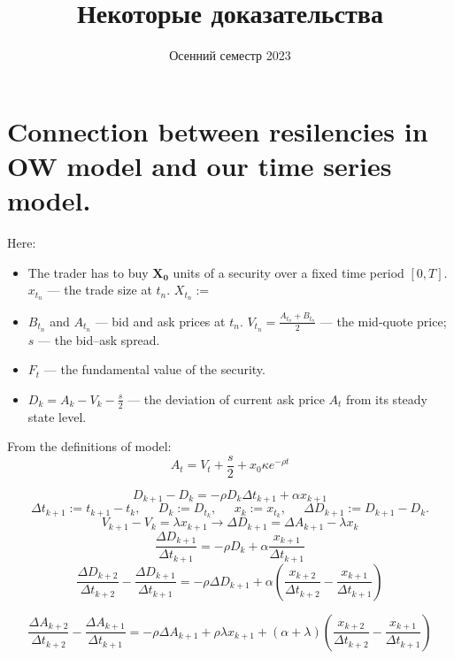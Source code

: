 \documentclass[a4paper]{article}
\date{Осенний семестр 2023}
\title{Некоторые доказательства}
\theoremstyle{definition}
\begin{document}
    \section{Connection between resilencies in OW model and our time series model.}

    Here:
       \begin{itemize}
        \item The trader has to buy $\mathbf{X_0}$ units of a security over a ﬁxed time period $[0,T]$. $x_{t_n}$ 
        --- the trade size at $t_n$. $X_{t_n} := $ 
        \item $B_{t_n}$ and $A_{t_n}$ --- bid and ask prices at $t_n$. $V_{t_n} = \frac{A_{t_n} + B_{t_n}}{2}$ 
        --- the mid-quote price; $s$ --- the bid–ask spread.
        \item $F_t$ --- the fundamental value of the security.
        \item $ D_k = A_k - V_k - \frac{s}{2} $ --- the deviation of current ask price $A_t$ from its steady state level.

       \end{itemize}
       From the definitions of model:
       \[A_t = V_t + \frac{s}{2} + x_0 \kappa e^{- \rho t}\]
       
    \[ D_{k+1} - D_k = -\rho D_k \Delta t_{k+1} + \alpha x_{k+1} \]
    \[ \Delta t_{k+1} := t_{k+1} - t_k, \; \; \; \; \; D_k := D_{t_k}, \; \; \; \; \; x_{k}:= x_{t_k}, \; \; \; \; \; \Delta D_{k+1} := D_{k+1} - D_k . \]
    \[ V_{k+1} - V_k = \lambda x_{k+1} \rightarrow \Delta D_{k+1} = \Delta A_{k+1} - \lambda x_k \] 
    \[ \frac{\Delta D_{k+1}}{\Delta t_{k+1}} = - \rho D_k + \alpha \frac{x_{k+1}}{\Delta t_{k+1}} \] 
    \[ \frac{\Delta D_{k+2}}{\Delta t_{k+2}} - \frac{\Delta D_{k+1}}{\Delta t_{k+1}} 
        = - \rho \Delta D_{k+1} + \alpha ( \frac{x_{k+2}}{\Delta t_{k+2}} - \frac{x_{k+1}}{\Delta t_{k+1}}) \] 
    
    \[ \frac{\Delta A_{k+2}}{\Delta t_{k+2}} - \frac{\Delta A_{k+1}}{\Delta t_{k+1}} 
        = - \rho \Delta A_{k+1} + \rho \lambda x_{k+1} + (\alpha + \lambda) (\frac{x_{k+2}}{\Delta t_{k+2}} - \frac{x_{k+1}}{\Delta t_{k+1}}) \] 
\end{document}
